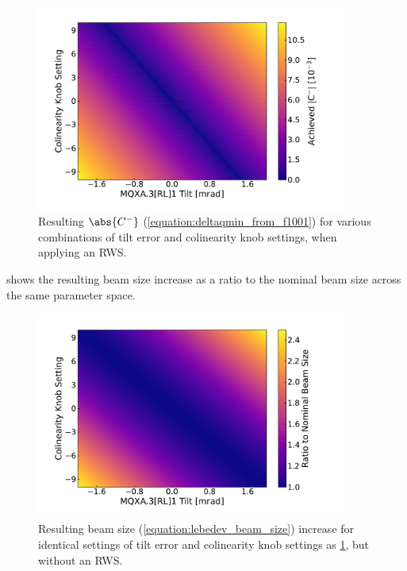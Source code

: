 \begin{figure}[!htb]
    \centering
    \includegraphics*[width=0.91\textwidth]{Figures/IR_Coupling_Correction/cminus_colin_tilt_compensation_with_waist.pdf}
    \caption{Resulting \(\abs{C^{-}}\) (\cref{equation:deltaqmin_from_f1001}) for various combinations of tilt error and colinearity knob settings, when applying an RWS.}
    \label{figure:cminus_colin_vs_tilt_with_waist}
\end{figure}

 shows the resulting beam size increase as a ratio to the nominal beam size across the same parameter space.

\begin{figure}[!htb]
    \centering
    \includegraphics*[width=0.91\textwidth]{Figures/IR_Coupling_Correction/ip_beam_size_growth_colin_tilt_compensation_no_waist.pdf}
    \caption{Resulting beam size (\cref{equation:lebedev_beam_size}) increase for identical settings of tilt error and colinearity knob settings as \cref{figure:cminus_colin_vs_tilt_with_waist}, but without an RWS.}
    \label{figure:beam_size_colin_vs_tilt_no_waist}
\end{figure}

